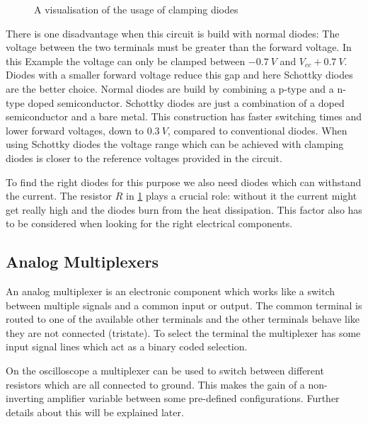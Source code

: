 \begin{figure}[htb]
	\centering
	\caption{A visualisation of the usage of clamping diodes}
	\label{fig:clamping-diodes}
\end{figure}

There is one disadvantage when this circuit is build with normal diodes: The voltage between the two terminals must be greater than the forward voltage. In this Example the voltage can only be clamped between $\SI{-0,7}{V}$ and $V_{cc} + \SI{0,7}{V}$. Diodes with a smaller forward voltage reduce this gap and here Schottky diodes are the better choice. Normal diodes are build by combining a p-type and a n-type doped semiconductor. Schottky diodes are just a combination of a doped semiconductor and a bare metal. This construction has faster switching times and lower forward voltages, down to $\SI{0,3}{V}$, compared to conventional diodes. When using Schottky diodes the voltage range which can be achieved with clamping diodes is closer to the reference voltages provided in the circuit.

To find the right diodes for this purpose we also need diodes which can withstand the current. The resistor $R$ in \cref{fig:clamping-diodes} plays a crucial role: without it the current might get really high and the diodes burn from the heat dissipation. This factor also has to be considered when looking for the right electrical components.

\subsection{Analog Multiplexers}

An analog multiplexer is an electronic component which works like a switch between multiple signals and a common input or output. The common terminal is routed to one of the available other terminals and the other terminals behave like they are not connected (tristate). To select the terminal the multiplexer has some input signal lines which act as a binary coded selection.

On the oscilloscope a multiplexer can be used to switch between different resistors which are all connected to ground. This makes the gain of a non-inverting amplifier variable between some pre-defined configurations. Further details about this will be explained later.
